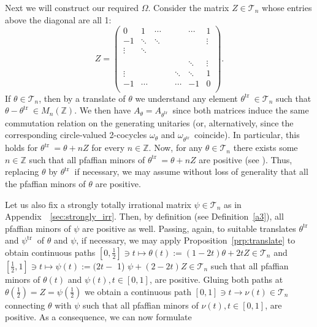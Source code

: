 \documentclass[9pt, BCOR=2mm]{amsart}
\numberwithin{equation}{section}
\numberwithin{equation}{section}
\begin{document}
 


 Next we will construct our required $\Omega.$ Consider the matrix $Z \in \mathcal{T}_n$ whose entries above the diagonal are all 1: 
\begin{equation}\label{eq:def_of_Z}
	Z = 
   \left( \begin{array}{cccccccc}
0 & 1 & \cdots  &  &  & \cdots &1  \\
-1 & \ddots &\ddots  & &   &  &\vdots \\
\vdots & \ddots  &   &  & &  &\\
 &  & &  &  &  &\\
&  &   & &  & \ddots  & \vdots\\
  \vdots &  &  & &   \ddots  & \ddots & 1\\
-1 & \cdots &  &  &  \cdots &  -1 & 0\\
\end{array} \right) .
\end{equation}
If $\theta \in \mathcal{T}_n$, then by a translate of $\theta$ we understand any element $\theta^{\text {tr }} \in \mathcal{T}_n$ such that $\theta-\theta^{\text {tr }} \in M_n(\mathbb{Z})$. We then have $A_\theta=A_{\theta^{\text {tr }}}$ since both matrices induce the same commutation relation on the generating unitaries (or, alternatively, since the corresponding circle-valued 2-cocycles $\omega_\theta$ and $\omega_{\theta^{\text {tr }}}$ coincide). In particular, this holds for $\theta^{\text {tr }}=\theta+n Z$ for every $n \in \mathbb{Z}$. Now, for any $\theta \in \mathcal{T}_n$ there exists some $n \in \mathbb{Z}$ such that all pfaffian minors of $\theta^{\text {tr }}=\theta+n Z$ are positive (see \cite[Proposition 4.6]{Cha20}). Thus, replacing $\theta$ by $\theta^{\text {tr }}$ if necessary, we may assume without loss of generality that all the pfaffian minors of $\theta$ are positive.

Let us also fix a strongly totally irrational matrix $\psi \in \mathcal{T}_n$ as in Appendix~~\ref{sec:strongly_irr}. Then, by definition (see Definition~\ref{a3}), all pfaffian minors of $\psi$ are positive as well. Passing, again, to suitable translates $\theta^{\text {tr }}$ and $\psi^{\text {tr }}$ of $\theta$ and $\psi$, if necessary, we may apply Proposition~\ref{prp:translate} to obtain continuous paths $\left[0, \frac{1}{2}\right] \ni t \mapsto \theta(t):=(1-2 t) \theta+2 t Z \in \mathcal{T}_n$ and $\left[\frac{1}{2}, 1\right] \ni t \mapsto \psi(t):=(2 t-$ 1) $\psi+(2-2 t) Z \in \mathcal{T}_n$ such that all pfaffian minors of $\theta(t)$ and $\psi(t), t \in[0,1]$, are positive. Gluing both paths at $\theta\left(\frac{1}{2}\right)=Z=\psi\left(\frac{1}{2}\right)$ we obtain a continuous path $[0,1] \ni t \rightarrow \nu(t) \in \mathcal{T}_n$ connecting $\theta$ with $\psi$ such that all pfaffian minors of $\nu(t), t \in[0,1]$, are positive. As a consequence, we can now formulate
\end{document}

